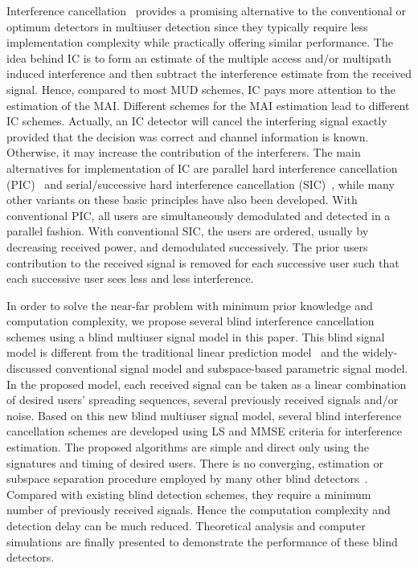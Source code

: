\documentclass[a4paper,10pt,fleqn, twocolumn]{IEEETran}
\begin{document}
Interference
cancellation~\cite{Yoon93,Patel94,Wijk95,Divsalar96,Kim98,Bugallo01}
provides a promising alternative to the conventional or optimum
detectors in multiuser detection since they typically require less
implementation complexity while practically offering similar
performance. The idea behind IC is to form an estimate of the
multiple access and/or multipath induced interference and then
subtract the interference estimate from the received signal.
Hence, compared to most MUD schemes, IC pays more attention to the
estimation of the MAI. Different schemes for the MAI estimation
lead to different IC schemes. Actually, an IC detector will cancel
the interfering signal exactly provided that the decision was
correct and channel information is known. Otherwise, it may
increase the contribution of the interferers. The main
alternatives for implementation of IC are parallel hard
interference cancellation (PIC)~\cite{Divsalar96,Kim98} and
serial/successive hard interference cancellation
(SIC)~\cite{Patel94,Wijk95}, while many other variants on these
basic principles have also been developed. With conventional PIC,
all users are simultaneously demodulated and detected in a
parallel fashion. With conventional SIC, the users are ordered,
usually by decreasing received power, and demodulated
successively. The prior users contribution to the received signal
is removed for each successive user such that each successive user
sees less and less interference.

In order to solve the near-far problem with minimum prior
knowledge and computation complexity, we propose several blind
interference cancellation schemes using a blind multiuser signal
model in this paper. This blind signal model is different from the
traditional linear prediction model~\cite{Haykin96} and the
widely-discussed conventional signal model and subspace-based
parametric signal model. In the proposed model, each received
signal can be taken as a linear combination of desired users'
spreading sequences, several previously received signals and/or
noise. Based on this new blind multiuser signal model, several
blind interference cancellation schemes are developed using LS and
MMSE criteria for interference estimation. The proposed algorithms
are simple and direct only using the signatures and timing of
desired users. There is no converging, estimation or subspace
separation procedure employed by many other blind
detectors~\cite{Madh94,Honi95,Wang98,Wang99}. Compared with
existing blind detection schemes, they require a minimum number of
previously received signals. Hence the computation complexity and
detection delay can be much reduced. Theoretical analysis and
computer simulations are finally presented to demonstrate the
performance of these blind detectors.
\end{document}
